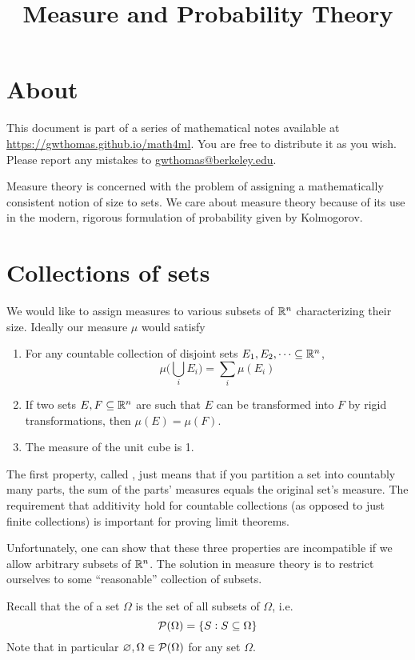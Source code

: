 \documentclass{article}
\title{Measure and Probability Theory}
\begin{document}
\maketitle

\section{About}
This document is part of a series of mathematical notes available at \url{https://gwthomas.github.io/math4ml}.
You are free to distribute it as you wish.
Please report any mistakes to \url{gwthomas@berkeley.edu}.

Measure theory is concerned with the problem of assigning a mathematically consistent notion of size to sets.
We care about measure theory because of its use in the modern, rigorous formulation of probability given by Kolmogorov.

\section{Collections of sets}
We would like to assign measures to various subsets of $\mathbb{R}^n$ characterizing their size.
Ideally our measure $\mu$ would satisfy
\begin{enumerate}
\item For any countable collection of disjoint sets $E_1, E_2, \dots \subseteq \mathbb{R}^n$,
\[\mu\bigg(\bigcup_i E_i\bigg) = \sum_i \mu(E_i)\]
\item If two sets $E, F \subseteq \mathbb{R}^n$ are such that $E$ can be transformed into $F$ by rigid transformations, then $\mu(E) = \mu(F)$.
\item The measure of the unit cube is 1.
\end{enumerate}
The first property, called , just means that if you partition a set into countably many parts, the sum of the parts' measures equals the original set's measure.
The requirement that additivity hold for countable collections (as opposed to just finite collections) is important for proving limit theorems.

Unfortunately, one can show that these three properties are incompatible if we allow arbitrary subsets of $\mathbb{R}^n$.
The solution in measure theory is to restrict ourselves to some ``reasonable'' collection of subsets.

Recall that the  of a set $\Omega$ is the set of all subsets of $\Omega$, i.e.
\[\mathcal{P}(\Omega) = \{S : S \subseteq \Omega\}\]
Note that in particular $\varnothing, \Omega \in \mathcal{P}(\Omega)$ for any set $\Omega$.
\end{document}
